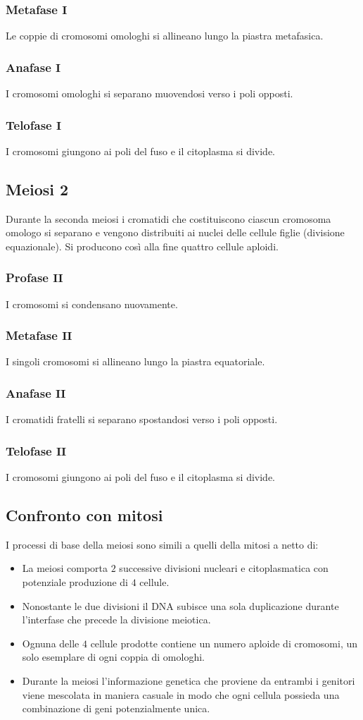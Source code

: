 \subsubsection{Metafase $\mathbf{I}$}
Le coppie di cromosomi omologhi si allineano lungo la piastra metafasica.
\subsubsection{Anafase $\mathbf{I}$}
I cromosomi omologhi si separano muovendosi verso i poli opposti. 
\subsubsection{Telofase $\mathbf{I}$}
I cromosomi giungono ai poli del fuso e il citoplasma si divide.
\subsection{Meiosi $\mathbf{2}$}
Durante la seconda meiosi i cromatidi che costituiscono ciascun cromosoma omologo si separano e vengono distribuiti ai nuclei delle cellule figlie (divisione equazionale). Si producono
cos\`i alla fine quattro cellule aploidi. 
\subsubsection{Profase $\mathbf{II}$}
I cromosomi si condensano nuovamente. 
\subsubsection{Metafase $\mathbf{II}$}
I singoli cromosomi si allineano lungo la piastra equatoriale. 
\subsubsection{Anafase $\mathbf{II}$}
I cromatidi fratelli si separano spostandosi verso i poli opposti. 
\subsubsection{Telofase $\mathbf{II}$}
I cromosomi giungono ai poli del fuso e il citoplasma si divide. 
\subsection{Confronto con mitosi}
I processi di base della meiosi sono simili a quelli della mitosi a netto di:
\begin{itemize}
	\item La meiosi comporta $2$ successive divisioni nucleari e citoplasmatica con potenziale produzione di $4$ cellule. 
	\item Nonostante le due divisioni il DNA subisce una sola duplicazione durante l'interfase che precede la divisione meiotica. 
	\item Ognuna delle $4$ cellule prodotte contiene un numero aploide di cromosomi, un solo esemplare di ogni coppia di omologhi. 
	\item Durante la meiosi l'informazione genetica che proviene da entrambi i genitori viene mescolata in maniera casuale in modo che ogni cellula possieda una combinazione di geni
		potenzialmente unica. 
\end{itemize}
